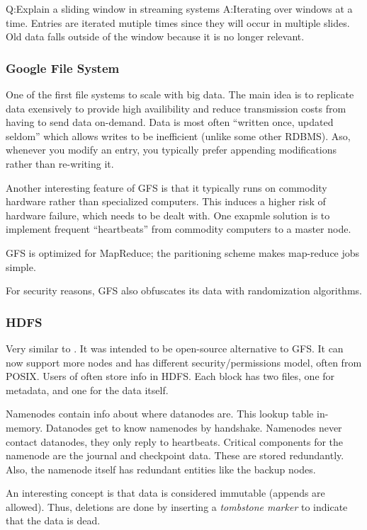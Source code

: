 Q:\@ Explain a sliding window in streaming systems
\newline A:\@ Iterating over windows at a time. Entries are  iterated mutiple times since they
will occur in multiple slides. Old data falls outside of the window because it is no longer relevant.

\subsubsection{Google File System}\label{sec:GFS}
One of the first file systems to scale with big data. The main idea is to replicate data
exensively to provide high availibility and reduce transmission costs from having to send data on-demand.
Data is most often ``written once, updated seldom'' which allows writes to be inefficient (unlike some other RDBMS). Aso, whenever you modify an entry, you typically prefer appending modifications rather than re-writing it.

Another interesting feature of GFS is that it typically runs on commodity hardware rather than
specialized computers. This induces a higher risk of hardware failure, which needs to be dealt with.
One exapmle solution is to implement frequent ``heartbeats'' from commodity computers to a master node.

GFS is optimized for MapReduce; the paritioning scheme makes map-reduce jobs simple.

For security reasons, GFS also obfuscates its data with randomization algorithms.

\subsubsection{HDFS}\label{sec:HDFS}
Very similar to . It was intended to be open-source alternative to GFS.\@
It can now support more nodes and has different security/permissions model, often from POSIX.
Users of  often store info in HDFS.
Each block has two files, one for metadata, and one for the data itself.

Namenodes contain info about where datanodes are. This lookup table in-memory.
Datanodes get to know namenodes by handshake. Namenodes never contact datanodes, they only reply
to heartbeats.
Critical components for the namenode are the journal and checkpoint data.
These are stored redundantly. Also, the namenode itself has redundant entities like the backup nodes.

An interesting concept is that data is considered immutable (appends are allowed). Thus, deletions are
done by inserting a \textit{tombstone marker} to indicate that the data is dead.

